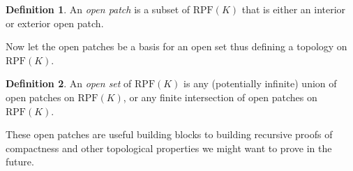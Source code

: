 \documentclass[twoside]{article}
\theoremstyle{plain}%
\theoremstyle{definition}
\newtheorem{definition}{Definition}[section]
\theoremstyle{remark}
\begin{document}
\begin{appendices}
\begin{definition}
An \textit{open patch} is a subset of \(\text{RPF}(K)\) that is either an interior or exterior open patch.
\end{definition}

Now let the open patches be a basis for an open set thus defining a topology on \(\text{RPF}(K)\).

\begin{definition}
An \textit{open set} of \(\text{RPF}(K)\) is any (potentially infinite) union of open patches on \(\text{RPF}(K)\), or any finite intersection of open patches on \(\text{RPF}(K)\).
\end{definition}

These open patches are useful building blocks to building recursive proofs of compactness and other topological properties we might want to prove in the future.

\end{appendices}
\end{document}

